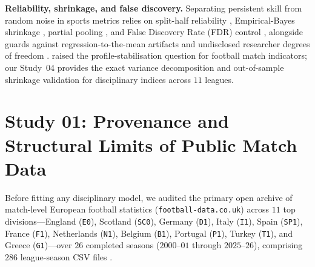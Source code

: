 \documentclass[10pt,twocolumn]{article}
\begin{document}
\textbf{Reliability, shrinkage, and false discovery.} Separating persistent skill from random noise in sports metrics relies on split-half reliability \citep{cronbach1951alpha}, Empirical-Bayes shrinkage \citep{efron1975stein,brown2008season}, partial pooling \citep{gelman2012multiple}, and False Discovery Rate (FDR) control \citep{benjamini1995controlling}, alongside guards against regression-to-the-mean artifacts \citep{barnett2005regression} and undisclosed researcher degrees of freedom \citep{simmons2011false,ioannidis2005why,peng2011reproducible}. \citet{johnson2010stable} raised the profile-stabilisation question for football match indicators; our Study~04 provides the exact variance decomposition and out-of-sample shrinkage validation for disciplinary indices across $11$ leagues.

\section{Study 01: Provenance and Structural Limits of Public Match Data}

Before fitting any disciplinary model, we audited the primary open archive of match-level European football statistics (\texttt{football-data.co.uk}) across $11$ top divisions---England (\texttt{E0}), Scotland (\texttt{SC0}), Germany (\texttt{D1}), Italy (\texttt{I1}), Spain (\texttt{SP1}), France (\texttt{F1}), Netherlands (\texttt{N1}), Belgium (\texttt{B1}), Portugal (\texttt{P1}), Turkey (\texttt{T1}), and Greece (\texttt{G1})---over $26$ completed seasons ($2000\text{--}01$ through $2025\text{--}26$), comprising $286$ league-season CSV files \citep{wilkinson2016fair,gebru2021datasheets}.
\end{document}

